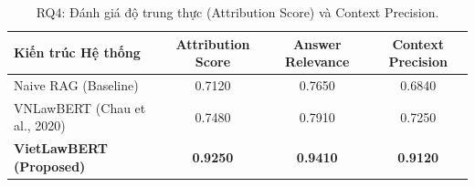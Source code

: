 \begin{table}[h]
\centering
\caption{RQ4: Đánh giá độ trung thực (Attribution Score) và Context Precision.}
\begin{tabular}{lccc}
\toprule
Kiến trúc Hệ thống & Attribution Score & Answer Relevance & Context Precision \\
\midrule
Naive RAG (Baseline) & 0.7120 & 0.7650 & 0.6840 \\
VNLawBERT (Chau et al., 2020) & 0.7480 & 0.7910 & 0.7250 \\
\textbf{VietLawBERT (Proposed)} & \textbf{0.9250} & \textbf{0.9410} & \textbf{0.9120} \\
\bottomrule
\end{tabular}
\end{table}

